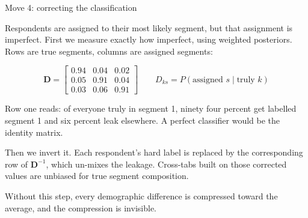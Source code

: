 \documentclass[
  ignorenonframetext,
  aspectratio=169,
]{beamer}
\newcommand{\kicker}[1]{\par\noindent{\footnotesize\color{vteal}\textbf{\MakeUppercase{#1}}}\par\vspace{0.4em}}
\begin{document}
\begin{frame}[shrink]{Move 4: correcting the classification}
\label{move-4-correcting-the-classification}
\kicker{the bch three step}

\footnotesize

Respondents are assigned to their most likely segment, but that
assignment is imperfect. First we measure exactly how imperfect, using
weighted posteriors. Rows are true segments, columns are assigned
segments:

\[
\mathbf{D} = \begin{bmatrix} 0.94 & 0.04 & 0.02 \\ 0.05 & 0.91 & 0.04 \\ 0.03 & 0.06 & 0.91 \end{bmatrix}
\qquad D_{ks} = P(\text{assigned } s \mid \text{truly } k)
\]

\vspace{0.4em}

Row one reads: of everyone truly in segment 1, ninety four percent get
labelled segment 1 and six percent leak elsewhere. A perfect classifier
would be the identity matrix.

\vspace{0.4em}

Then we invert it. Each respondent's hard label is replaced by the
corresponding row of \(\mathbf{D}^{-1}\), which un-mixes the leakage.
Cross-tabs built on those corrected values are unbiased for true segment
composition.

\vspace{0.4em}

\begin{center}
\colorbox{vteal!15}{\parbox{0.9\textwidth}{\centering
Without this step, every demographic difference is compressed toward the average, and the compression is invisible.}}
\end{center}

\end{frame}
\end{document}
